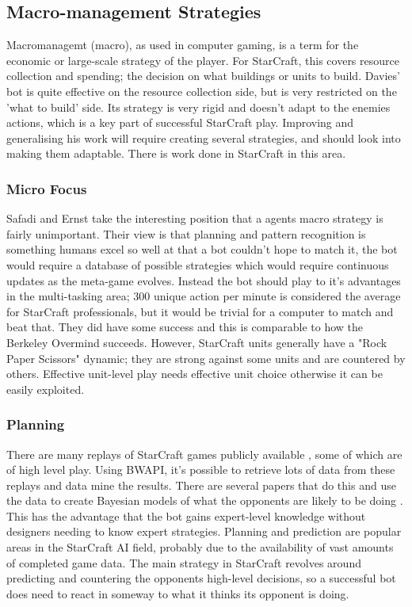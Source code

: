 \documentclass[11pt,openright,a4paper]{report}
\begin{document}
\subsection{Macro-management Strategies}
Macromanagemt (macro), as used in computer gaming, is a term for the economic or large-scale strategy of the player. For StarCraft, this covers resource collection and spending; the decision on what buildings or units to build. Davies' bot is quite effective on the resource collection side, but is very restricted on the 'what to build' side. Its strategy is very rigid and doesn't adapt to the enemies actions, which is a key part of successful StarCraft play. Improving and generalising his work will require creating several strategies, and should look into making them adaptable. There is work done in StarCraft in this area.

\subsubsection{Micro Focus}
Safadi and Ernst \cite{safadi2010organization} take the interesting position that a agents macro strategy is fairly unimportant. Their view is that planning and pattern recognition is something humans excel so well at that a bot couldn't hope to match it, the bot would require a database of possible strategies which would require continuous updates as the meta-game evolves. Instead the bot should play to it's advantages in the multi-tasking area; 300 unique action per minute is considered the average for StarCraft professionals, but it would be trivial for a computer to match and beat that. They did have some success and this is comparable to how the Berkeley Overmind succeeds. However, StarCraft units generally have a "Rock Paper Scissors" dynamic; they are strong against some units and are countered by others. Effective unit-level play needs effective unit choice otherwise it can be easily exploited.

\subsubsection{Planning}
There are many replays of StarCraft games publicly available \cite{Replays}, some of which are of high level play. Using BWAPI, it's possible to retrieve lots of data from these replays and data mine the results. There are several papers that do this and use the data to create Bayesian models of what the opponents are likely to be doing \cite{synnaeve2011bayesian,hostetler2012inferring,weber2009data}.  This has the advantage that the bot gains expert-level knowledge without designers needing to know expert strategies. Planning and prediction are popular areas in the StarCraft AI field, probably due to the availability of vast amounts of completed game data. The main strategy in StarCraft revolves around predicting and countering the opponents high-level decisions, so a successful bot does need to react in someway to what it thinks its opponent is doing.
\end{document}
